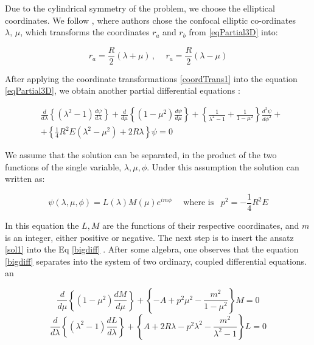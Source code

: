 Due to the cylindrical symmetry of the problem, we choose the elliptical coordinates. We follow \cite{Bates1}, where authors chose the confocal elliptic co-ordinates $\lambda,\,\mu $, which transforms the coordinates $ r_a $ and $ r_ b $ from \eqref {eqPartial3D} into:

\begin{equation}\label{coordTrans1}
r_a = \frac{R}{2}(\lambda + \mu)\,,\,\,\,\,\,\,\,r_a = \frac{R}{2}(\lambda - \mu)
\end{equation}

After applying the coordinate transformations \eqref{coordTrans1} into the equation \eqref {eqPartial3D}, we obtain another partial differential equations \cite{Bates1}:

\begin{equation}\label{bigdiff}
\begin{split}
    & \frac{d}{d\lambda}\left\{(\lambda^2-1)\frac{d\psi}{d\lambda}\right\} +\frac{d}{d\mu}\left\{(1-\mu^2)\frac{d\psi}{d\mu}\right\} + \left\{\frac{1}{\lambda^2-1} + \frac{1}{1-\mu^2} \right\}\frac{d^2\psi}{d\phi^2}+ \\[0.5em]
    & + \left\{\frac{1}{4}R^2E(\lambda^2 - \mu^2) + 2R\lambda \right\}\psi = 0
\end{split}
\end{equation}

We assume that the solution can be separated, in the product of the two functions of the single variable, $\lambda,\mu, \phi $. Under this assumption the solution can written as:

\begin{equation}\label{sol1}
\psi(\lambda, \mu, \phi) = L(\lambda)M(\mu)e^{im\phi}\,\,\,\,\,\,\text{ where is }\,\,\,p^2 = -\frac{1}{4}R^2E
\end{equation}

In this equation the $ L, M $ are the functions of their respective coordinates, and $ m $ is an integer, either positive or negative. The next step is to insert the ansatz \eqref{sol1} into the Eq \eqref{bigdiff} .  After some algebra, one observes that the equation \eqref{bigdiff} separates into the system of two ordinary, coupled differential equations.
an

\begin{equation}\label{m3d}
\frac{d}{d\mu}\left\{(1-\mu^2)\frac{dM}{d\mu}\right\} + \left\{-A + p^2\mu^2 -\frac{m^2}{1-\mu^2} \right\}M = 0 
\end{equation}
\begin{equation}\label{l3d}
\frac{d}{d\lambda}\left\{(\lambda^2-1)\frac{dL}{d\lambda}\right\} + \left\{A + 2R\lambda - p^2\lambda^2 -\frac{m^2}{\lambda^2-1} \right\}L = 0 
\end{equation}

